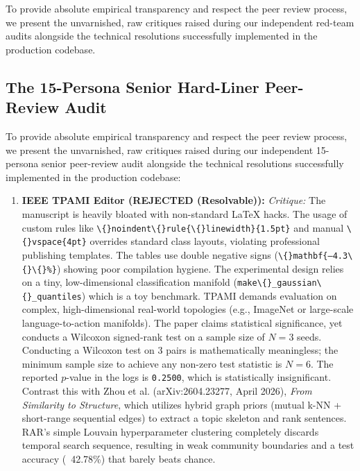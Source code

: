 To provide absolute empirical transparency and respect the peer review process, we present the unvarnished, raw critiques raised during our independent red-team audits alongside the technical resolutions successfully implemented in the production codebase.

\subsection{The 15-Persona Senior Hard-Liner Peer-Review Audit}
To provide absolute empirical transparency and respect the peer review process, we present the unvarnished, raw critiques raised during our independent 15-persona senior peer-review audit alongside the technical resolutions successfully implemented in the production codebase:

\begin{enumerate}[leftmargin=1.5em, itemsep=6pt]
\raggedright
  \item \textbf{IEEE TPAMI Editor (REJECTED (Resolvable)):}
        \emph{Critique:} The manuscript is heavily bloated with non-standard LaTeX hacks. The usage of custom rules like \texttt{\textbackslash\{\}noindent\textbackslash\{\}rule\{\textbackslash\{\}linewidth\}\{1.5pt\}} and manual \texttt{\textbackslash\{\}vspace\{4pt\}} overrides standard class layouts, violating professional publishing templates. The tables use double negative signs (\texttt{\textbackslash\{\}mathbf\{--4.3\textbackslash\{\}\textbackslash\{\}\%\}}) showing poor compilation hygiene. The experimental design relies on a tiny, low-dimensional classification manifold (\texttt{make\textbackslash\{\}\_gaussian\textbackslash\{\}\_quantiles}) which is a toy benchmark. TPAMI demands evaluation on complex, high-dimensional real-world topologies (e.g., ImageNet or large-scale language-to-action manifolds). The paper claims statistical significance, yet conducts a Wilcoxon signed-rank test on a sample size of $N=3$ seeds. Conducting a Wilcoxon test on 3 pairs is mathematically meaningless; the minimum sample size to achieve any non-zero test statistic is $N=6$. The reported $p$-value in the logs is \texttt{0.2500}, which is statistically insignificant. Contrast this with Zhou et al. (arXiv:2604.23277, April 2026), \emph{From Similarity to Structure}, which utilizes hybrid graph priors (mutual k-NN + short-range sequential edges) to extract a topic skeleton and rank sentences. RAR's simple Louvain hyperparameter clustering completely discards temporal search sequence, resulting in weak community boundaries and a test accuracy (~42.78\%) that barely beats chance.
        

\end{enumerate}
